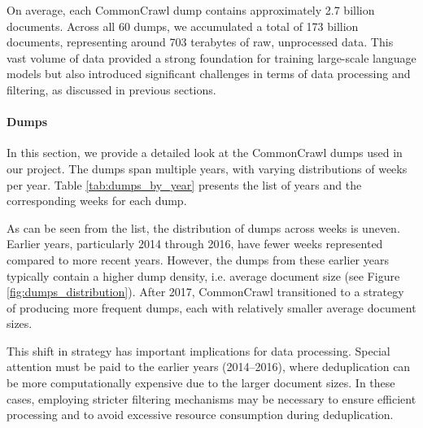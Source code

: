 On average, each CommonCrawl dump contains approximately 2.7 billion documents. Across all 60 dumps, we accumulated a total of 173 billion documents, representing around 703 terabytes of raw, unprocessed data. This vast volume of data provided a strong foundation for training large-scale language models but also introduced significant challenges in terms of data processing and filtering, as discussed in previous sections.



\paragraph{Dumps}
In this section, we provide a detailed look at the CommonCrawl dumps used in our project. The dumps span multiple years, with varying distributions of weeks per year. Table \ref{tab:dumps_by_year} presents  the list of years and the corresponding weeks for each dump.






As can be seen from the list, the distribution of dumps across weeks is uneven. Earlier years, particularly 2014 through 2016, have fewer weeks represented compared to more recent years. However, the dumps from these earlier years typically contain a higher dump density, i.e. average document size (see Figure \ref{fig:dumps_distribution}). After 2017, CommonCrawl transitioned to a strategy of producing more frequent dumps, each with relatively smaller average document sizes.

This shift in strategy has important implications for data processing. Special attention must be paid to the earlier years (2014–2016), where deduplication can be more computationally expensive due to the larger document sizes. In these cases, employing stricter filtering mechanisms may be necessary to ensure efficient processing and to avoid excessive resource consumption during deduplication.


